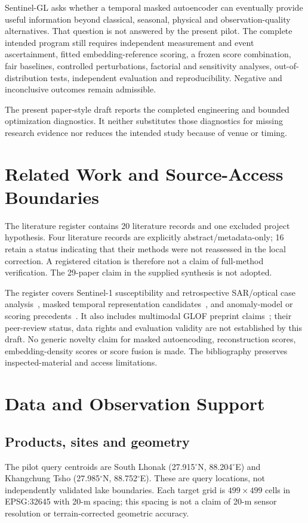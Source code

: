 \documentclass[10pt,twocolumn]{article}
\begin{document}
Sentinel-GL asks whether a temporal masked autoencoder can eventually provide useful information beyond classical, seasonal, physical and observation-quality alternatives. That question is not answered by the present pilot. The complete intended program still requires independent measurement and event ascertainment, fitted embedding-reference scoring, a frozen score combination, fair baselines, controlled perturbations, factorial and sensitivity analyses, out-of-distribution tests, independent evaluation and reproducibility. Negative and inconclusive outcomes remain admissible.

The present paper-style draft reports the completed engineering and bounded optimization diagnostics. It neither substitutes those diagnostics for missing research evidence nor reduces the intended study because of venue or timing.

\section{Related Work and Source-Access Boundaries}
The literature register contains 20 literature records and one excluded project hypothesis. Four literature records are explicitly abstract/metadata-only; 16 retain a status indicating that their methods were not reassessed in the local correction. A registered citation is therefore not a claim of full-method verification. The 29-paper claim in the supplied synthesis is not adopted.

The register covers Sentinel-1 susceptibility and retrospective SAR/optical case analysis~\cite{LIT008,LIT009}, masked temporal representation candidates~\cite{LIT013,LIT014}, and anomaly-model or scoring precedents~\cite{LIT015,LIT016,LIT017,LIT018}. It also includes multimodal GLOF preprint claims~\cite{LIT019,LIT020,LIT021}; their peer-review status, data rights and evaluation validity are not established by this draft. No generic novelty claim for masked autoencoding, reconstruction scores, embedding-density scores or score fusion is made. The bibliography preserves inspected-material and access limitations.

\section{Data and Observation Support}
\subsection{Products, sites and geometry}
The pilot query centroids are South Lhonak (27.915$^\circ$N, 88.204$^\circ$E) and Khangchung Tsho (27.985$^\circ$N, 88.752$^\circ$E). These are query locations, not independently validated lake boundaries. Each target grid is $499\times499$ cells in EPSG:32645 with 20-m spacing; this spacing is not a claim of 20-m sensor resolution or terrain-corrected geometric accuracy.
\end{document}

